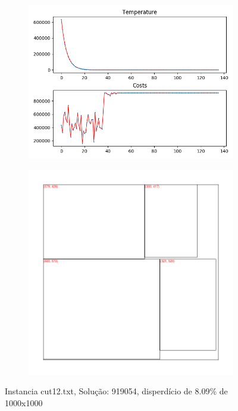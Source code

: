 
\begin{figure}
\centering
\begin{subfigure}{.5\textwidth}
  \centering
  \includegraphics[width=1\linewidth]{results/cut12/1/plot}
  \label{fig:sub1}
\end{subfigure}%
\begin{subfigure}{.5\textwidth}
  \centering
  \includegraphics[width=1\linewidth]{results/cut12/1/cut}
  \label{fig:sub2}
\end{subfigure}
\caption{Instancia cut12.txt, Solução: 919054, disperdício de 8.09\% de 1000x1000}
\label{fig:test}
\end{figure}


